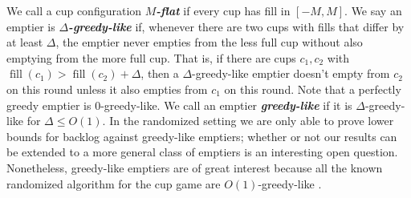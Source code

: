 \documentclass[twocolumn]{article}[10pt]
\newcommand{\defn}[1]{{\textit{\textbf{\boldmath #1}}}\xspace}
\DeclareMathOperator{\fil}{\text{fill}}
\begin{document}
We call a cup configuration $M$\defn{-flat} if every cup has fill
in $[-M, M]$. We say an emptier is $\Delta$\defn{-greedy-like}
if, whenever there are two cups with fills that differ
by at least $\Delta$, the emptier never empties from the less full
cup without also emptying from the more full cup. That is, if
there are cups $c_1, c_2$ with $\fil(c_1) > \fil(c_2) + \Delta$,
then a $\Delta$-greedy-like emptier doesn't empty from $c_2$ on
this round unless it also empties from $c_1$ on this round.
Note that a perfectly greedy
emptier is $0$-greedy-like. We call an emptier \defn{greedy-like} if it is
$\Delta$-greedy-like for $\Delta \le O(1)$.
In the randomized setting we are only able to prove lower bounds for backlog
against greedy-like emptiers; whether or not our results can be extended to a
more general class of emptiers is an interesting open question. 
Nonetheless, greedy-like emptiers are of great interest because
all the known randomized algorithm for the cup game are
$O(1)$-greedy-like \cite{wku20}\cite{mbe19}.
\end{document}
